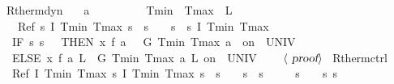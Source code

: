 \documentclass[envcountsame]{llncs}
\begin{document}
\begin{example}\label{ex:therm-rsol}
\begin{isabellebody}
\isanewline
{}\isamarkupfalse%
\ R{\isacharunderscore}therm{\isacharunderscore}dyn{\isacharcolon}\isanewline
\ \ \ {\isachardoublequoteopen}a\ {\isachargreater}\ {}{\isachardoublequoteclose}\ \ {\isachardoublequoteopen}{}\ {\isasymle}\ {\isasymtau}{\isachardoublequoteclose}\ \ {\isachardoublequoteopen}{}\ {\isacharless}\ Tmin{\isachardoublequoteclose}\ \ {\isachardoublequoteopen}Tmax\ {\isacharless}\ L{\isachardoublequoteclose}\isanewline
\ \ \ {\isachardoublequoteopen}Ref\ {\isasymlceil}{\isasymlambda}s{\isachardot}\ I\ Tmin\ Tmax\ s\ {\isasymand}\ s{\isachardollar}{}\ {\isacharequal}\ {}\ {\isasymand}\ s{\isachardollar}{}\ {\isacharequal}\ s{\isachardollar}{}{\isasymrceil}\ {\isasymlceil}I\ Tmin\ Tmax{\isasymrceil}\ {\isasymge}\ \isanewline
\ \ {\isacharparenleft}IF\ {\isacharparenleft}{\isasymlambda}s{\isachardot}\ s{\isachardollar}{}\ {\isacharequal}\ {}{\isacharparenright}\ THEN\ {\isacharparenleft}x{\isasymacute}{\isacharequal}\ f\ a\ {}\ {\isacharampersand}\ G\ Tmin\ Tmax\ a\ {}\ on\ {\isacharbraceleft}{}{\isachardot}{\isachardot}{\isasymtau}{\isacharbraceright}\ UNIV\ {\isacharat}\ {}{\isacharparenright}\ \isanewline
\ \ ELSE\ {\isacharparenleft}x{\isasymacute}{\isacharequal}\ f\ a\ L\ {\isacharampersand}\ G\ Tmin\ Tmax\ a\ L\ on\ {\isacharbraceleft}{}{\isachardot}{\isachardot}{\isasymtau}{\isacharbraceright}\ UNIV\ {\isacharat}\ {}{\isacharparenright}{\isacharparenright}{\isachardoublequoteclose}\isanewline
\ \ $\langle \isa{proof}\rangle$\isanewline
\isanewline
{}\isamarkupfalse%
\ R{\isacharunderscore}therm{\isacharunderscore}ctrl{\isacharcolon}\isanewline
\ \ {\isachardoublequoteopen}Ref\ {\isasymlceil}I\ Tmin\ Tmax{\isasymrceil}\ {\isasymlceil}{\isasymlambda}s{\isachardot}\ I\ Tmin\ Tmax\ s\ {\isasymand}\ s{\isachardollar}{}\ {\isacharequal}\ {}\ {\isasymand}\ s{\isachardollar}{}\ {\isacharequal}\ s{\isachardollar}{}{\isasymrceil}\ {\isasymge}\isanewline
\ \ {\isacharparenleft}{}\ {\isacharcolon}{\isacharcolon}{\isacharequal}\ {\isacharparenleft}{\isasymlambda}s{\isachardot}\ {}{\isacharparenright}{\isacharparenright}{\isacharsemicolon}\ {\isacharparenleft}{}\ {\isacharcolon}{\isacharcolon}{\isacharequal}\ {\isacharparenleft}{\isasymlambda}s{\isachardot}\ s{\isachardollar}{}{\isacharparenright}{\isacharparenright}{\isacharsemicolon}\isanewline

\end{isabellebody}
\end{example}
\end{document}
